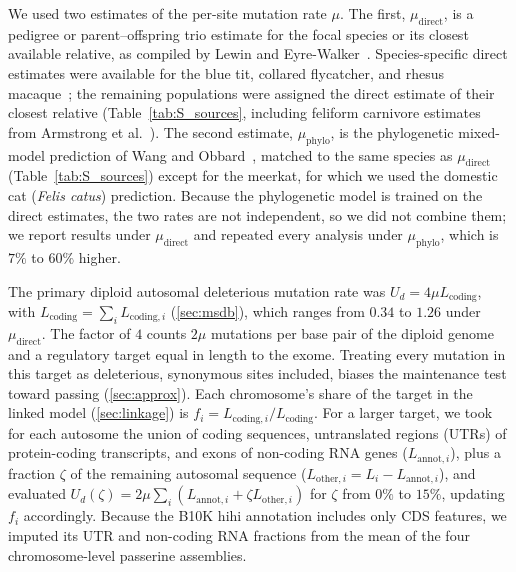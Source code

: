 \documentclass{article}
\begin{document}
We used two estimates of the per-site mutation rate $\mu$. The first, $\mu_\text{direct}$, is a pedigree or parent--offspring trio estimate for the focal species or its closest available relative, as compiled by Lewin and Eyre-Walker~\cite{lewin2026}. Species-specific direct estimates were available for the blue tit, collared flycatcher, and rhesus macaque~\cite{smeds2016,wang2020,bergeron2021,bergeron2023}; the remaining populations were assigned the direct estimate of their closest relative (Table~\ref{tab:S_sources}, including feliform carnivore estimates from Armstrong et al.~\cite{armstrong2024}). The second estimate, $\mu_\text{phylo}$, is the phylogenetic mixed-model prediction of Wang and Obbard~\cite{wangobbard2023}, matched to the same species as $\mu_\text{direct}$ (Table~\ref{tab:S_sources}) except for the meerkat, for which we used the domestic cat (\emph{Felis catus}) prediction. Because the phylogenetic model is trained on the direct estimates, the two rates are not independent, so we did not combine them; we report results under $\mu_\text{direct}$ and repeated every analysis under $\mu_\text{phylo}$, which is $7\%$ to $60\%$ higher.

The primary diploid autosomal deleterious mutation rate was $U_d = 4\mu L_\text{coding}$, with $L_\text{coding} = \sum_i L_{\text{coding},i}$ (\autoref{sec:msdb}), which ranges from $0.34$ to $1.26$ under $\mu_\text{direct}$. The factor of $4$ counts $2\mu$ mutations per base pair of the diploid genome and a regulatory target equal in length to the exome. Treating every mutation in this target as deleterious, synonymous sites included, biases the maintenance test toward passing (\autoref{sec:approx}). Each chromosome's share of the target in the linked model (\autoref{sec:linkage}) is $f_i = L_{\text{coding},i}/L_\text{coding}$. For a larger target, we took for each autosome the union of coding sequences, untranslated regions (UTRs) of protein-coding transcripts, and exons of non-coding RNA genes ($L_{\text{annot},i}$), plus a fraction $\zeta$ of the remaining autosomal sequence ($L_{\text{other},i} = L_i - L_{\text{annot},i}$), and evaluated $U_d(\zeta) = 2\mu\sum_i(L_{\text{annot},i} + \zeta L_{\text{other},i})$ for $\zeta$ from $0\%$ to $15\%$, updating $f_i$ accordingly. Because the B10K hihi annotation includes only CDS features, we imputed its UTR and non-coding RNA fractions from the mean of the four chromosome-level passerine assemblies.
\end{document}
